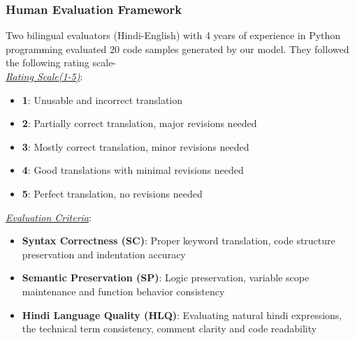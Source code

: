 \documentclass[11pt,a4paper]{article}
\begin{document}
\subsubsection{Human Evaluation Framework}
Two bilingual evaluators (Hindi-English) with 4 years of experience in Python programming evaluated 20 code samples generated by our model. They followed the following rating scale-\\ 
\textit{\underline{Rating Scale(1-5)}}:
\begin{itemize}[itemsep=0pt, topsep=0pt]
    \item \textbf{1}: Unusable and incorrect translation
    \item \textbf{2}: Partially correct translation, major revisions needed
    \item \textbf{3}: Mostly correct translation, minor revisions needed
    \item \textbf{4}: Good translations with minimal revisions needed
    \item \textbf{5}: Perfect translation, no revisions needed
\end{itemize}
\textit{\underline{Evaluation Criteria}}:
\begin{itemize}[itemsep=0pt, topsep=0pt]
    \item \textbf{Syntax Correctness (SC)}: Proper keyword translation, code structure preservation and indentation accuracy
    \item \textbf{Semantic Preservation (SP)}: Logic preservation, variable scope maintenance and function behavior consistency
    \item \textbf{Hindi Language Quality (HLQ)}: Evaluating natural hindi expressions, the technical term consistency, comment clarity and code readability
\end{itemize}
\end{document}
